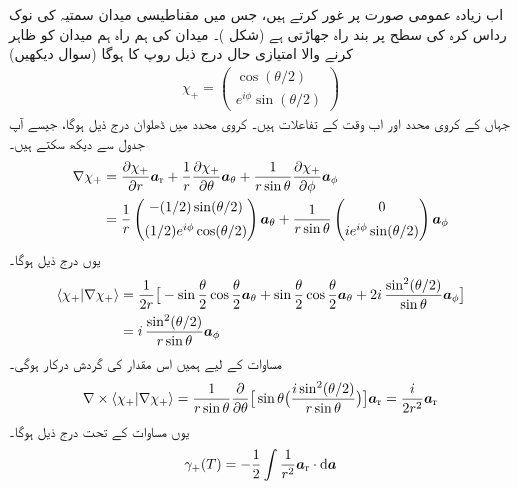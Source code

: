 اب  زیادہ عمومی صورت پر غور کرتے ہیں،  جس میں مقناطیسی میدان سمتیہ کی  نوک رداس   کرہ  کی  سطح پر    بند راہ جھاڑتی ہے  (شکل  )۔ میدان  کی ہم راہ  ہم میدان کو ظاہر کرنے والا امتیازی حال درج ذیل روپ کا ہوگا (سوال  دیکھیں)
\begin{align}
\chi_{+} = 
\begin{pmatrix}
\cos (\theta/2) \\[0.5em]
e^{i \phi} \sin (\theta /2)
\end{pmatrix}
\end{align}
جہاں  کے  کروی محدد  اور    اب وقت کے تفاعلات ہیں۔ کروی محدد میں ڈھلوان  درج ذیل ہوگا،  جیسے آپ جدول سے دیکھ سکتے ہیں۔ 
\begin{align}
\nabla \chi_{+} &= \frac{\partial \chi_{+}}{\partial r} {\boldsymbol{a}}_{\textup{r}} + \frac{1}{r} \frac{\partial \chi_{+}}{\partial \theta} {\boldsymbol{a}}_{\theta} + \frac{1}{r \sin \theta} \frac{\partial \chi_{+}}{\partial \phi} {\boldsymbol{a}}_{\phi} \nonumber\\
&= \frac{1}{r} 
\begin{pmatrix}
- (1/2) \sin (\theta/2) \\[0.5em]
(1/2) e^{i \phi} \cos (\theta /2)
\end{pmatrix}
{\boldsymbol{a}}_{\theta} + \frac{1}{r \sin \theta}
\begin{pmatrix}
0 \\[0.5em]
i e^{i \phi} \sin (\theta /2)
\end{pmatrix} 
{\boldsymbol{a}}_{\phi}
\end{align}
یوں درج ذیل ہوگا۔
\begin{align}
\langle \chi_{+} | \nabla \chi_{+} \rangle &= \frac{1}{2r} \big [ - \sin \frac{\theta}{2} \cos \frac{\theta}{2} {\boldsymbol{a}}_{\theta} + \sin \frac{\theta}{2} \cos \frac{\theta}{2} {\boldsymbol{a}}_{\theta} + 2i \,\frac{\sin^2 (\theta/2)}{\sin \theta} {\boldsymbol{a}}_{\phi} \big ] \nonumber\\
&= i \,\frac{\sin^2 (\theta /2)}{r \sin \theta}{\boldsymbol{a}}_{\phi}
\end{align}
مساوات  کے لیے ہمیں اس  مقدار کی گردش درکار ہوگی۔
\begin{align}
\nabla \times \langle \chi_{+} | \nabla \chi_{+} \rangle = \frac{1}{r \sin \theta} \frac{\partial}{\partial \theta} \big [ \sin \theta \big ( \frac{i \sin^2 (\theta /2)}{r \sin \theta} \big ) \big ] {\boldsymbol{a}}_{\textup{r}} = \frac{i}{2r^2} {\boldsymbol{a}}_{\textup{r}}
\end{align}
یوں مساوات  کے تحت درج ذیل ہوگا۔
\begin{align}
\gamma_{+} (T) = - \frac{1}{2} \int \frac{1}{r^2} \ar \cdot \dif \kvec{a}
\end{align}
